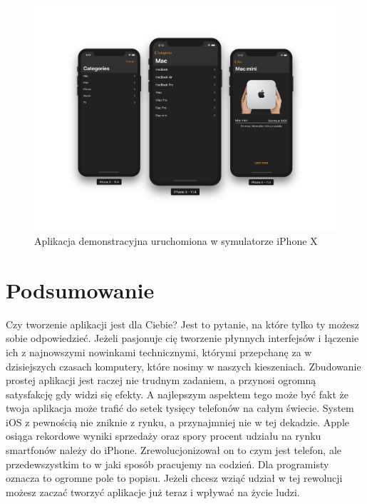 \documentclass{article}
\begin{document}
\begin{figure}[h]
\centering
\includegraphics[width=12cm]{apple-store-app-screens}
\caption{Aplikacja demonstracyjna uruchomiona w symulatorze iPhone X}
\end{figure}

\section*{Podsumowanie}
Czy tworzenie aplikacji jest dla Ciebie? Jest to pytanie, na które tylko ty możesz
sobie odpowiedzieć. Jeżeli pasjonuje cię tworzenie płynnych interfejsów i łączenie
ich z najnowszymi nowinkami technicznymi, którymi przepchanę za w dzisiejszych czasach
komputery, które nosimy w naszych kieszeniach. Zbudowanie prostej aplikacji jest
raczej nie trudnym zadaniem, a przynosi ogromną satysfakcję gdy widzi się efekty.
A najlepszym aspektem tego może być fakt że twoja aplikacja może trafić do setek 
tysięcy telefonów na całym świecie. System iOS z pewnością nie zniknie z rynku, 
a przynajmniej nie w tej dekadzie. Apple osiąga rekordowe wyniki sprzedaży oraz
spory procent udziału na rynku smartfonów należy do iPhone. Zrewolucjonizował on
to czym jest telefon, ale przedewszystkim to w jaki sposób pracujemy na codzień.
Dla programisty oznacza to ogromne pole to popisu. Jeżeli chcesz wziąć udział w
tej rewolucji możesz zaczać tworzyć aplikacje już teraz i wpływać na życie ludzi.
\end{document}
